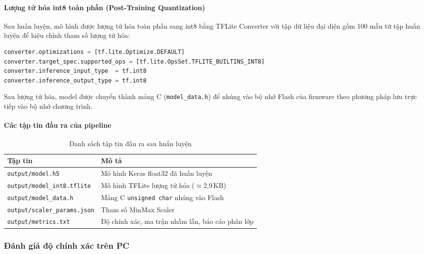 \paragraph{Lượng tử hóa int8 toàn phần (Post-Training Quantization)}
Sau huấn luyện, mô hình được lượng tử hóa toàn phần sang int8 bằng TFLite Converter với tập dữ liệu đại diện gồm 100 mẫu từ tập huấn luyện để hiệu chỉnh tham số lượng tử hóa:

\begin{lstlisting}[language=Python, caption=Cấu hình lượng tử hóa int8 (trích train\_and\_convert.py)]
converter.optimizations = [tf.lite.Optimize.DEFAULT]
converter.target_spec.supported_ops = [tf.lite.OpsSet.TFLITE_BUILTINS_INT8]
converter.inference_input_type  = tf.int8
converter.inference_output_type = tf.int8
\end{lstlisting}

Sau lượng tử hóa, model được chuyển thành mảng C (\texttt{model\_data.h}) để nhúng vào bộ nhớ Flash của firmware theo phương pháp lưu trực tiếp vào bộ nhớ chương trình.

\paragraph{Các tập tin đầu ra của pipeline}

\begin{table}[h!]
\centering
\caption{Danh sách tập tin đầu ra sau huấn luyện}
\label{tab:task5-artifacts}
\begin{tabular}{|l|p{8cm}|}
\hline
\textbf{Tập tin} & \textbf{Mô tả} \\
\hline
\texttt{output/model.h5} & Mô hình Keras float32 đã huấn luyện \\
\texttt{output/model\_int8.tflite} & Mô hình TFLite lượng tử hóa ($\approx$2,9\,KB) \\
\texttt{output/model\_data.h} & Mảng C \texttt{unsigned char} nhúng vào Flash \\
\texttt{output/scaler\_params.json} & Tham số MinMax Scaler \\
\texttt{output/metrics.txt} & Độ chính xác, ma trận nhầm lẫn, báo cáo phân lớp \\
\hline
\end{tabular}
\end{table}

\subsubsection*{Đánh giá độ chính xác trên PC}

